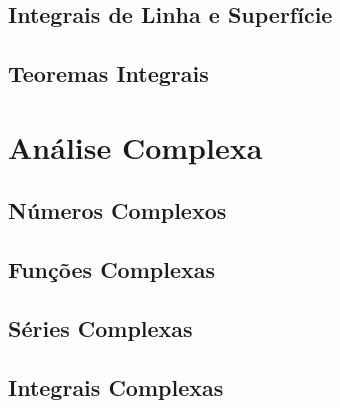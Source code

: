 \documentclass[a5paper, 12pt]{book}
\begin{document}
\chapter{Integrais de Linha e Superfície}
\chapter{Teoremas Integrais}

\part{Análise Complexa}

\chapter{Números Complexos}
\chapter{Funções Complexas}
\chapter{Séries Complexas}
\chapter{Integrais Complexas}
\end{document}
